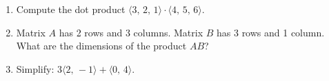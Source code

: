 \documentclass[10pt]{article}
\begin{document}
\namedateperiod

\vspace{0.15in}

\begin{enumerate}[leftmargin=1.6em, itemsep=18pt]

\item Compute the dot product $\langle 3,\, 2,\, 1\rangle \cdot \langle 4,\, 5,\, 6\rangle$.

\vspace{1.6in}

\item Matrix $A$ has 2 rows and 3 columns. Matrix $B$ has 3 rows and 1 column.
      What are the dimensions of the product $AB$?

\vspace{1.2in}

\item Simplify: $3\langle 2,\,-1\rangle + \langle 0,\,4\rangle$.

\vspace{1.2in}

\end{enumerate}
\end{document}
